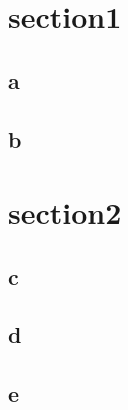 \documentclass{beamer}
\begin{document}
\section{section1}
\subsection{a}
\begin{frame}
\end{frame}
\subsection{b}
\begin{frame}
\end{frame}
\section{section2}
\subsection{c}
\begin{frame}
\end{frame}
\subsection{d}
\begin{frame}
\end{frame}
\subsection{e}
\begin{frame}
\end{frame}
\end{document}
